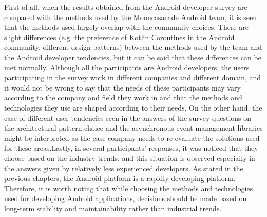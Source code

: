 First of all, when the results obtained from the Android developer survey are compared with the methods used by the Mooncasacade Android team, it is seen that the methods used largely overlap with the community choices. There are slight differences (e.g. the preference of Kotlin Coroutines in the Android community, different design patterns) between the methods used by the team and the Android developer tendencies, but it can be said that these differences can be met normally. Although all the participants are Android developers, the users participating in the survey work in different companies and different domain, and it would not be wrong to say that the needs of these participants may vary according to the company and field they work in and that the methods and technologies they use are shaped according to their needs. On the other hand, the case of different user tendencies seen in the answers of the survey questions on the architectural pattern choice and the asynchronous event management libraries might be interpreted as the case company needs to re-evaluate the solutions used for these areas.Lastly, in several participants' responses, it was noticed that they choose based on the industry trends, and this situation is observed especially in the answers given by relatively less experienced developers. As stated in the previous chapters, the Android platform is a rapidly developing platform. Therefore, it is worth noting that while choosing the methods and technologies used for developing Android applications, decisions should be made based on long-term stability and maintainability rather than industrial trends.

